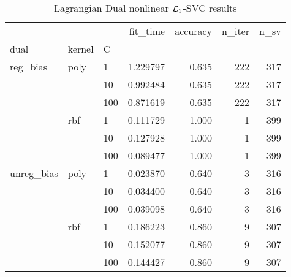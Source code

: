 \begin{table}[H]
\centering
\caption{Lagrangian Dual nonlinear $\protect \mathcal{L}_1$-SVC results}
\label{nonlinear_lagrangian_dual_l1_svc_cv_results}
\begin{tabular}{lllrrrr}
\toprule
           &     &     &  fit\_time &  accuracy &  n\_iter &  n\_sv \\
dual & kernel & C &           &           &         &       \\
\midrule
reg\_bias & poly & 1   &  1.229797 &     0.635 &     222 &   317 \\
           &     & 10  &  0.992484 &     0.635 &     222 &   317 \\
           &     & 100 &  0.871619 &     0.635 &     222 &   317 \\
           & rbf & 1   &  0.111729 &     1.000 &       1 &   399 \\
           &     & 10  &  0.127928 &     1.000 &       1 &   399 \\
           &     & 100 &  0.089477 &     1.000 &       1 &   399 \\
unreg\_bias & poly & 1   &  0.023870 &     0.640 &       3 &   316 \\
           &     & 10  &  0.034400 &     0.640 &       3 &   316 \\
           &     & 100 &  0.039098 &     0.640 &       3 &   316 \\
           & rbf & 1   &  0.186223 &     0.860 &       9 &   307 \\
           &     & 10  &  0.152077 &     0.860 &       9 &   307 \\
           &     & 100 &  0.144427 &     0.860 &       9 &   307 \\
\bottomrule
\end{tabular}
\end{table}
